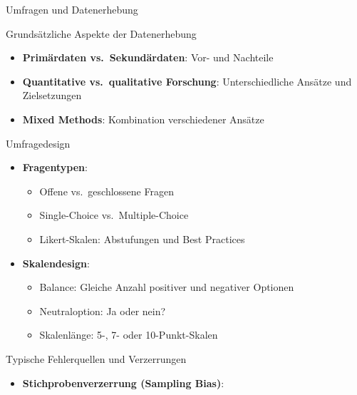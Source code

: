 \documentclass[
  ignorenonframetext,
]{beamer}
\providecommand{\tightlist}{%
  \setlength{\itemsep}{0pt}\setlength{\parskip}{0pt}}
\begin{document}
\begin{frame}{Umfragen und Datenerhebung}
\protect{}\label{umfragen-und-datenerhebung}
\begin{block}{Grundsätzliche Aspekte der Datenerhebung}
\protect{}\label{grundsuxe4tzliche-aspekte-der-datenerhebung}
\begin{itemize}
\tightlist
\item
  \textbf{Primärdaten vs.~Sekundärdaten}: Vor- und Nachteile
\item
  \textbf{Quantitative vs.~qualitative Forschung}: Unterschiedliche
  Ansätze und Zielsetzungen
\item
  \textbf{Mixed Methods}: Kombination verschiedener Ansätze
\end{itemize}
\end{block}

\begin{block}{Umfragedesign}
\protect{}\label{umfragedesign}
\begin{itemize}
\tightlist
\item
  \textbf{Fragentypen}:

  \begin{itemize}
  \tightlist
  \item
    Offene vs.~geschlossene Fragen
  \item
    Single-Choice vs.~Multiple-Choice
  \item
    Likert-Skalen: Abstufungen und Best Practices
  \end{itemize}
\item
  \textbf{Skalendesign}:

  \begin{itemize}
  \tightlist
  \item
    Balance: Gleiche Anzahl positiver und negativer Optionen
  \item
    Neutraloption: Ja oder nein?
  \item
    Skalenlänge: 5-, 7- oder 10-Punkt-Skalen
  \end{itemize}
\end{itemize}
\end{block}

\begin{block}{Typische Fehlerquellen und Verzerrungen}
\protect{}\label{typische-fehlerquellen-und-verzerrungen}
\begin{itemize}
\tightlist
\item
  \textbf{Stichprobenverzerrung (Sampling Bias)}:


\end{itemize}
\end{block}
\end{frame}
\end{document}

